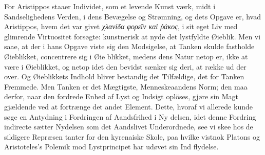 \documentclass[12pt,a4paper]{book}
\newcommand{\gk}[1]{\textit{#1}}
\begin{document}
For Aristippos staaer Individet, som et levende Kunst\-%
værk, midt i Sandselighedens Verden, i dens Bevægelse og
Strømning, og dets Opgave er, hvad Aristippos, hvem det var
givet \gk{χλανίδα φορεῖν καὶ ῥάκος}, i sit eget Liv med glimrende
Virtuositet forsøgte: kunstnerisk at nyde det lystfyldte Øieblik.
Men vi saae, at der i hans Opgave viste sig den Modsigelse,
at Tanken skulde fastholde Øieblikket, concentrere sig i Øie\-%
blikket, medens dens Natur netop er, ikke at være i Øieblikket,
og netop idet den bevidst sænker sig deri, at række ud der\-%
over. Og Øieblikkets Indhold bliver bestandig det Tilfældige,
det for Tanken Fremmede. Men Tanken er det Mægtigste,
Menneskeaandens Norm; den maa derfor, naar den fordrede
Enhed af Lyst og Indsigt oplöses, gjøre sin Magt gjældende
ved at fortrænge det andet Element. Dette, hvoraf vi allerede
kunde søge en Antydning i Fordringen af Aandsfrihed i Ny\-%
delsen, idet denne Fordring indirecte sætter Nydelsen som det
Aandslivet Underordnede, see vi skee hos de sildigere Repræsen\-%
tanter for den kyrenaiske Skole, paa hvilke vistnok Platons og
Aristoteles's Polemik mod Lystprincipet har udøvet sin Ind\-%
flydelse.
\end{document}
